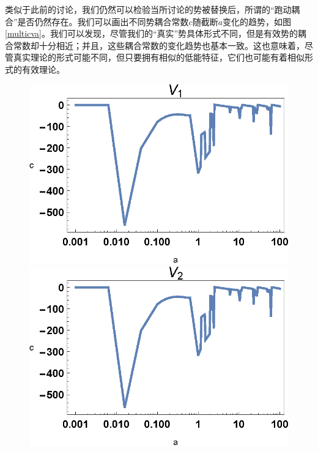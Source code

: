 \documentclass[cs4size,titlepage,twoside]{ctexart}
\begin{document}
类似于此前的讨论，我们仍然可以检验当所讨论的势被替换后，所谓的“跑动耦合”是否仍然存在。我们可以画出不同势耦合常数$c$随截断$a$变化的趋势，如图\ref{multicva}。我们可以发现，尽管我们的“真实”势具体形式不同，但是有效势的耦合常数却十分相近；并且，这些耦合常数的变化趋势也基本一致。这也意味着，尽管真实理论的形式可能不同，但只要拥有相似的低能特征，它们也可能有着相似形式的有效理论。
\begin{figure}[!hbtp]
	\begin{minipage}[t]{0.329\linewidth}
		\centering
		\includegraphics[width=1\textwidth]{V1_c1_veus_a}
	\end{minipage}
	\begin{minipage}[t]{0.329\linewidth}
		\centering
		\includegraphics[width=1\textwidth]{V2_c1_veus_a}
	\end{minipage}
	\begin{minipage}[t]{0.329\linewidth}

\end{minipage}
\end{figure}
\end{document}
